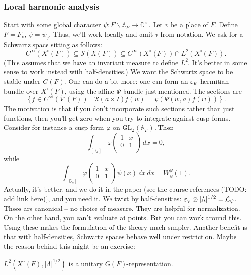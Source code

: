 \documentclass[reqno]{amsart} 
\begin{document}
\subsubsection{Local harmonic analysis}\label{sec:cq6tho3bu5}

Start with some global character $\psi : F \backslash \mathbb{A}_F \rightarrow \mathbb{C}^\times$.  Let $v$ be a place of $F$.  Define $F = F_v$, $\psi = \psi_v$.  Thus, we'll work locally and omit $v$ from notation.  We ask for a Schwartz space sitting as follows:
\begin{equation*}
  C_c^\infty(X^{\circ}(F)) \subseteq \mathcal{S}(X(F)) \subseteq C^\infty(X^{\circ}(F)) \cap L^2(X^{\circ}(F)).
\end{equation*}
(This assumes that we have an invariant measure to define $L^2$.  It's better in some sense to work instead with half-densities.)  We want the Schwartz space to be stable under $G(F)$.  One can do a bit more: one can form an $\varepsilon_\psi$-hermitian bundle over $X^{\circ}(F)$, using the affine $\Psi$-bundle just mentioned.  The sections are
\begin{equation*}
  \left\{ f \in C^\infty(V^{\circ}(F)) \mid \mathcal{R}(a \times I) f(w) = \psi(\Psi(w, a) f(w)) \right\}.
\end{equation*}
The motivation is that if you don't incorporate such sections rather than just functions, then you'll get zero when you try to integrate against cusp forms.  Consider for instance a cusp form $\varphi$ on $\mathrm{GL}_2(\mathbb{A}_F)$.  Then
\begin{equation*}
  \int_{[\mathbb{G}_a]} \varphi
  \begin{pmatrix}
    1 & x \\
    0 & 1 \\
  \end{pmatrix} \, d x= 0,
\end{equation*}
while
\begin{equation*}
  \int_{[\mathbb{G}_a]} \varphi
  \begin{pmatrix}
    1 & x \\
    0 & 1 \\
  \end{pmatrix}
  \psi(x) \, d x
  \, d x
  =
  W_\psi^\varphi(1).
\end{equation*}
Actually, it's better, and we do it in the paper (see the course references (TODO: add link here)), and you need it.  We twist by half-densities: $\varepsilon_\psi \otimes \lvert \Lambda \rvert^{1/2} = \mathcal{L}_\psi$.  These are canonical -- no choice of measure.  They are helpful for normalization.  On the other hand, you can't evaluate at points.  But you can work around this.  Using these makes the formulation of the theory much simpler.  Another benefit is that with half-densities, Schwartz spaces behave well under restriction.  Maybe the reason behind this might be an exercise:
\begin{exercise}\label{exercise:cq6tho3tag}
  $L^2(X^{\circ}(F), \lvert \Lambda \rvert^{1/2})$ is a unitary $G(F)$-representation.
\end{exercise}
\end{document}
